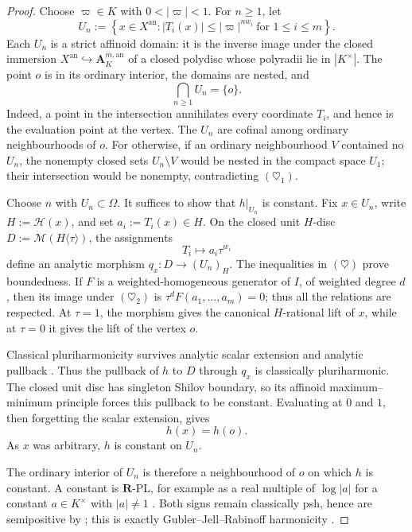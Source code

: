 \begin{proof}
Choose \(\varpi\in K\) with \(0<|\varpi|<1\).  For \(n\geq1\), let
\[
 U_n:=\left\{x\in X^{\mathrm{an}}:
 |T_i(x)|\leq |\varpi|^{nw_i}\ \text{for }1\leq i\leq m\right\}.
 \tag{\(\heartsuit\)}
\]
Each \(U_n\) is a strict affinoid domain: it is the inverse image under the
closed immersion \(X^{\mathrm{an}}\hookrightarrow\mathbf A_K^{m,\mathrm{an}}\)
of a closed polydisc whose polyradii lie in \(|K^\times|\).  The point \(o\)
is in its ordinary interior, the domains are nested, and
\[
                    \bigcap_{n\geq1}U_n=\{o\}.
 \tag{\(\heartsuit_1\)}
\]
Indeed, a point in the intersection annihilates every coordinate \(T_i\),
and hence is the evaluation point at the vertex.  The \(U_n\) are cofinal
among ordinary neighbourhoods of \(o\).  For otherwise, if an ordinary
neighbourhood \(V\) contained no \(U_n\), the nonempty closed sets
\(U_n\setminus V\) would be nested in the compact space \(U_1\); their
intersection would be nonempty, contradicting \((\heartsuit_1)\).

Choose \(n\) with \(U_n\subset\Omega\).  It suffices to show that
\(h|_{U_n}\) is constant.  Fix \(x\in U_n\), write
\(H:=\mathscr H(x)\), and set \(a_i:=T_i(x)\in H\).  On the closed unit
\(H\)-disc \(D:=\mathcal M(H\langle\tau\rangle)\), the assignments
\[
                        T_i\longmapsto a_i\tau^{w_i}
 \tag{\(\heartsuit_2\)}
\]
define an analytic morphism \(q_x:D\to (U_n)_H\).  The inequalities in
\((\heartsuit)\) prove boundedness.  If \(F\) is a weighted-homogeneous
generator of \(I\), of weighted degree \(d\), then its image under
\((\heartsuit_2)\) is \(\tau^dF(a_1,\ldots,a_m)=0\); thus all the
relations are respected.  At \(\tau=1\), the morphism gives the canonical
\(H\)-rational lift of \(x\), while at \(\tau=0\) it gives the lift of
the vertex \(o\).

Classical pluriharmonicity survives analytic scalar extension and analytic
pullback \cite[Proposition~7.2(6),(7)]{GR25Classical}.  Thus the pullback of
\(h\) to \(D\) through \(q_x\) is classically pluriharmonic.  The closed
unit disc has singleton Shilov boundary, so its affinoid
maximum--minimum principle \cite[Proposition~7.3]{GR25Classical} forces this
pullback to be constant.  Evaluating at \(0\) and \(1\), then forgetting
the scalar extension, gives
\[
                              h(x)=h(o).
\]
As \(x\) was arbitrary, \(h\) is constant on \(U_n\).

The ordinary interior of \(U_n\) is therefore a neighbourhood of \(o\) on
which \(h\) is constant.  A constant is \(\mathbf R\)-PL, for example as a
real multiple of \(\log|a|\) for a constant \(a\in K^\times\) with
\(|a|\ne1\) \cite[Definition~5.1]{GJR26}.  Both signs remain classically psh, hence are
semipositive by \cite[Theorem~4.3]{GR25Classical}; this is exactly
Gubler--Jell--Rabinoff harmonicity \cite[Definition~7.2]{GJR26}.
\end{proof}
